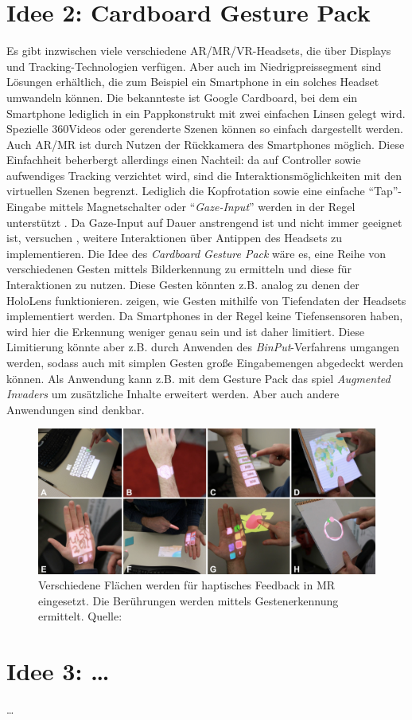 \documentclass[a4paper]{scrartcl}
\begin{document}
\section*{Idee 2: Cardboard Gesture Pack}
Es gibt inzwischen viele verschiedene AR/MR/VR-Headsets, die über Displays und Tracking-Technologien verfügen.
Aber auch im Niedrigpreissegment sind Lösungen erhältlich, die zum Beispiel ein Smartphone in ein solches Headset umwandeln können.
Die bekannteste ist Google Cardboard, bei dem ein Smartphone lediglich in ein Pappkonstrukt mit zwei einfachen Linsen gelegt wird.
Spezielle 360\degree Videos oder gerenderte Szenen können so einfach dargestellt werden.
Auch AR/MR ist durch Nutzen der Rückkamera des Smartphones möglich.
Diese Einfachheit beherbergt allerdings einen Nachteil:
da auf Controller sowie aufwendiges Tracking verzichtet wird, sind die Interaktionsmöglichkeiten mit den virtuellen Szenen begrenzt.
Lediglich die Kopfrotation sowie eine einfache \enquote{Tap}-Eingabe mittels Magnetschalter oder \enquote{\emph{Gaze-Input}} werden in der Regel unterstützt \parencite[vgl.][]{Yoo2015}.
Da Gaze-Input auf Dauer anstrengend ist und nicht immer geeignet ist, versuchen \textcite{Yan2016}, weitere Interaktionen über Antippen des Headsets zu implementieren.
Die Idee des \emph{Cardboard Gesture Pack} wäre es, eine Reihe von verschiedenen Gesten mittels Bilderkennung zu ermitteln und diese für Interaktionen zu nutzen.
Diese Gesten könnten z.B. analog zu denen der HoloLens funktionieren.
\textcites{Xiao2018}{Harrison2011} zeigen, wie Gesten mithilfe von Tiefendaten der Headsets implementiert werden.
Da Smartphones in der Regel keine Tiefensensoren haben, wird hier die Erkennung weniger genau sein und ist daher limitiert.
Diese Limitierung könnte aber z.B. durch Anwenden des \emph{BinPut}-Verfahrens \parencite{Todi2017} umgangen werden, sodass auch mit simplen Gesten große Eingabemengen abgedeckt werden können.
Als Anwendung kann z.B. mit dem Gesture Pack das spiel \emph{Augmented Invaders} um zusätzliche Inhalte erweitert werden.
Aber auch andere Anwendungen sind denkbar.

\begin{figure}[h]
	\centering
	\includegraphics[width=\textwidth]{figures/omnitouch.png}
	\caption{Verschiedene Flächen werden für haptisches Feedback in MR eingesetzt. Die Berührungen werden mittels Gestenerkennung ermittelt. Quelle: \autocite{Harrison2011}}
	\label{fig:omnitouch}
\end{figure}

\section*{Idee 3: \ldots}
\ldots

\printbibliography[nottype=online]
\printbibliography[title={Online Referenzen}, type=online]
\end{document}
